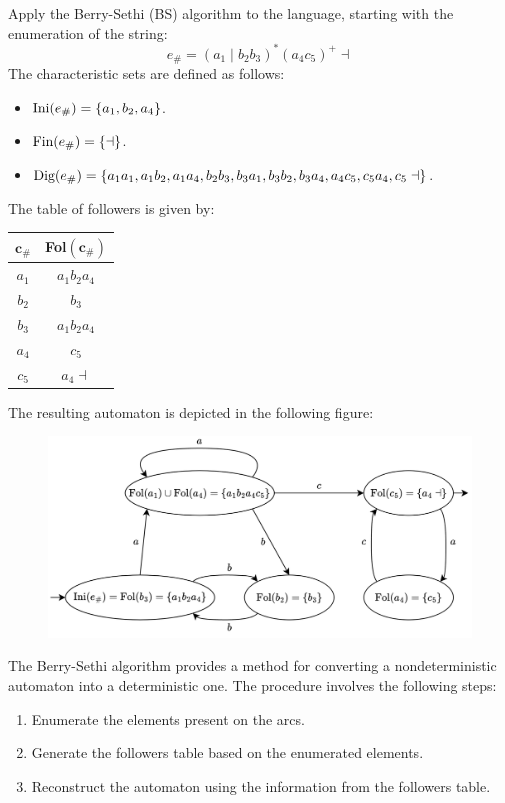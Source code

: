 \begin{example}
    Apply the Berry-Sethi (BS) algorithm to the language, starting with the enumeration of the string:
    \[e_{\#}=(a_1\mid b_2b_3)^{\ast}(a_4c_5)^{+} \dashv\]
    The characteristic sets are defined as follows:
    \begin{itemize}
        \item $\textnormal{Ini}(e_{\#})=\{a_1,b_2,a_4\}$.
        \item $\textnormal{Fin}(e_{\#})=\{\dashv\}$.
        \item $\textnormal{Dig}(e_{\#})=\{a_1a_1,a_1b_2,a_1a_4,b_2b_3,b_3a_1,b_3b_2,b_3a_4,a_4c_5,c_5a_4,c_5\dashv\}$.
    \end{itemize}
    The table of followers is given by:
    \begin{table}[H]
        \centering
        \begin{tabular}{cc}
        \hline
        \textbf{$\boldsymbol{c_{\#}}$} & \textbf{Fol$(\boldsymbol{c_{\#}})$} \\ \hline
        $a_1$                          & $a_1b_2a_4$                         \\
        $b_2$                          & $b_3$                               \\
        $b_3$                          & $a_1b_2a_4$                         \\
        $a_4$                          & $c_5$                               \\
        $c_5$                          & $a_4\dashv$                         \\ \hline
        \end{tabular}
    \end{table}
    The resulting automaton is depicted in the following figure:
    \begin{figure}[H]
        \centering
        \includegraphics[width=0.7\linewidth]{images/bs.png}
    \end{figure}
\end{example}
The Berry-Sethi algorithm provides a method for converting a nondeterministic automaton into a deterministic one. 
The procedure involves the following steps:
\begin{enumerate}
    \item Enumerate the elements present on the arcs.
    \item Generate the followers table based on the enumerated elements.
    \item Reconstruct the automaton using the information from the followers table.
\end{enumerate}

